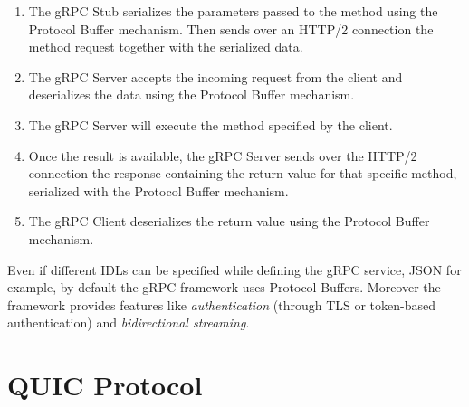 		\begin{enumerate}
			\item The gRPC Stub serializes the parameters passed to the method using the Protocol Buffer mechanism. Then sends over an HTTP/2 connection the method request together with the serialized data.
			\item The gRPC Server accepts the incoming request from the client and deserializes the data using the Protocol Buffer mechanism.
			\item The gRPC Server will execute the method specified by the client.
			\item Once the result is available, the gRPC Server sends over the HTTP/2 connection the response containing the return value for that specific method, serialized with the Protocol Buffer mechanism.
			\item The gRPC Client deserializes the return value using the Protocol Buffer mechanism.
		\end{enumerate}
		\par Even if different IDLs can be specified while defining the gRPC service, JSON for example, by default the gRPC framework uses Protocol Buffers. Moreover the framework provides features like \textit{authentication} (through TLS or token-based authentication) and \textit{bidirectional streaming}.
		
	\section{QUIC Protocol}
		\par 
	